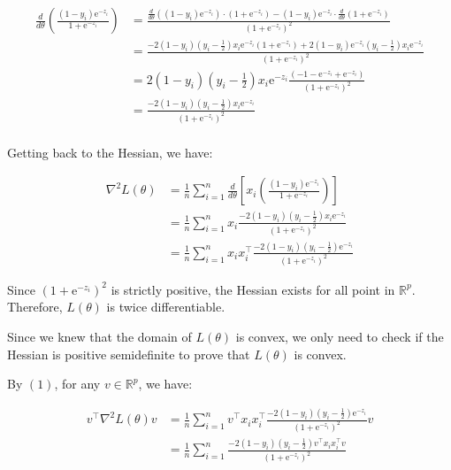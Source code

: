 \documentclass{article}
\begin{document}
\begin{align*}
    \frac{d}{d\theta} \left( \frac{(1 - y_i)\mathrm{e}^{-z_i}}{1 + \mathrm{e}^{-z_i}} \right)
    &= \frac{\frac{d}{d\theta}\left((1 - y_i)\mathrm{e}^{-z_i} \right) \cdot (1 + \mathrm{e}^{-z_i}) - (1 - y_i)\mathrm{e}^{-z_i} \cdot \frac{d}{d\theta}( 1 + \mathrm{e}^{-z_i})}{(1 + \mathrm{e}^{-z_i})^2} \\
    &= \frac{-2(1 - y_i)(y_i - \frac{1}{2})x_i\mathrm{e}^{-z_i} (1 + \mathrm{e}^{-z_i}) + 2 (1 - y_i)\mathrm{e}^{-z_i} (y_i - \frac{1}{2})x_i\mathrm{e}^{-z_i}}{(1 + \mathrm{e}^{-z_i})^2} \\
    &= 2(1 - y_i)(y_i - \frac{1}{2})x_i\mathrm{e}^{-z_i}\frac{ (-1 - \mathrm{e}^{-z_i} + \mathrm{e}^{-z_i})}{(1 +\mathrm{e}^{-z_i})^2} \\
    &= \frac{-2(1 - y_i)(y_i - \frac{1}{2})x_i\mathrm{e}^{-z_i}}{(1 +\mathrm{e}^{-z_i})^2} \\
\end{align*}

Getting back to the Hessian, we have:

\begin{align*}
    \nabla^2 L(\theta)
    &= \frac{1}{n} \sum_{i = 1}^n \frac{d}{d\theta} \left[ x_i \left( \frac{(1 - y_i)\mathrm{e}^{-z_i}}{1 + \mathrm{e}^{-z_i}} \right) \right] \\
    &= \frac{1}{n} \sum_{i = 1}^n x_i \frac{-2(1 - y_i)(y_i - \frac{1}{2})x_i\mathrm{e}^{-z_i}}{(1 +\mathrm{e}^{-z_i})^2} \\
    &= \frac{1}{n} \sum_{i = 1}^n x_i x_i^\intercal  \frac{-2(1 - y_i)(y_i - \frac{1}{2})\mathrm{e}^{-z_i}}{(1 +\mathrm{e}^{-z_i})^2} \tag{1}
\end{align*}

Since $(1 +\mathrm{e}^{-z_i})^2$ is strictly positive, the Hessian exists for all point in $\mathbb{R}^p$.
Therefore, $L(\theta)$ is twice differentiable.
\bigskip

Since we knew that the domain of $L(\theta)$ is convex, 
we only need to check if the Hessian is positive semidefinite to prove that $L(\theta)$ is convex.
\bigskip

By $(1)$, for any $v \in \mathbb{R}^p$, we have:

\begin{align*}
    v^\intercal  \nabla^2 L(\theta) v
    &= \frac{1}{n} \sum_{i = 1}^n v^\intercal  x_i x_i^\intercal  \frac{-2(1 - y_i)(y_i - \frac{1}{2})\mathrm{e}^{-z_i}}{(1 +\mathrm{e}^{-z_i})^2} v \\
    &= \frac{1}{n} \sum_{i = 1}^n \frac{-2(1 - y_i)(y_i - \frac{1}{2})v^\intercal  x_i x_i^\intercal  v}{(1 +\mathrm{e}^{-z_i})^2} \\
\end{align*}
\end{document}
